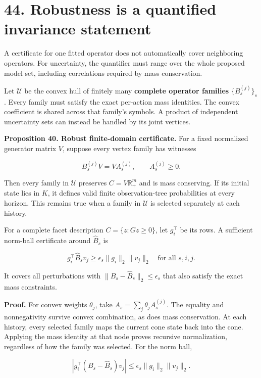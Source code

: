 \documentclass[11pt,letterpaper]{article}
\begin{document}
\section{44. Robustness is a quantified invariance
statement}\label{robustness-is-a-quantified-invariance-statement}

A certificate for one fitted operator does not automatically cover
neighboring operators. For uncertainty, the quantifier must range over
the whole proposed model set, including correlations required by mass
conservation.

Let \(\mathcal U\) be the convex hull of finitely many \textbf{complete
operator families} \(\{B_s^{(j)}\}_s\). Every family must satisfy the
exact per-action mass identities. The convex coefficient is shared
across that family's symbols. A product of independent uncertainty sets
can instead be handled by its joint vertices.

\textbf{Proposition 40. Robust finite-domain certificate.} For a fixed
normalized generator matrix \(V\), suppose every vertex family has
witnesses

\[
B_s^{(j)}V=VA_s^{(j)},\qquad A_s^{(j)}\geq0.
\]

Then every family in \(\mathcal U\) preserves \(C=V\mathbb R_+^m\) and
is mass conserving. If its initial state lies in \(K\), it defines valid
finite observation-tree probabilities at every horizon. This remains
true when a family in \(\mathcal U\) is selected separately at each
history.

For a complete facet description \(C=\{z:Gz\geq0\}\), let \(g_i^\top\)
be its rows. A sufficient norm-ball certificate around \(\widehat B_s\)
is

\[
\boxed{
 g_i^\top\widehat B_sv_j
 \geq\epsilon_s\|g_i\|_2\|v_j\|_2
 \quad\text{for all }s,i,j.
}
\]

It covers all perturbations with
\(\|B_s-\widehat B_s\|_2\leq\epsilon_s\) that also satisfy the exact
mass constraints.

\textbf{Proof.} For convex weights \(\theta_j\), take
\(A_s=\sum_j\theta_jA_s^{(j)}\). The equality and nonnegativity survive
convex combination, as does mass conservation. At each history, every
selected family maps the current cone state back into the cone. Applying
the mass identity at that node proves recursive normalization,
regardless of how the family was selected. For the norm ball,

\[
|g_i^\top(B_s-\widehat B_s)v_j|
\leq\epsilon_s\|g_i\|_2\|v_j\|_2.
\]
\end{document}
